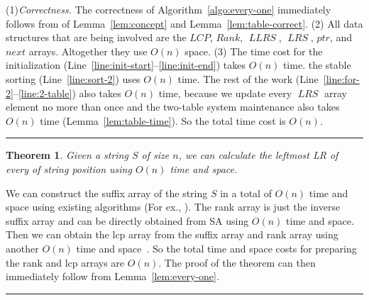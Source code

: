\documentclass[preprint]{elsarticle}
\newtheorem{theorem}{Theorem}[section]
\newcommand{\qedsymb}{\hfill{\rule{2mm}{2mm}}}
\newenvironment{proofsketch}{\begin{trivlist}
\item[\hspace{\labelsep}{\noindent Proof Sketch: }]
}{\qedsymb\end{trivlist}}
\DeclareMathOperator{\llrs}{\mathit{LLRS}}
\DeclareMathOperator{\lrs}{\mathit{LRS}}
\begin{document}
\begin{proofsketch}
  (1)\emph{Correctness.} The correctness of Algorithm~\ref{algo:every-one} immediately
  follows from of Lemma~\ref{lem:concept} and
  Lemma~\ref{lem:table-correct}.  (2) All data structures that are
  being involved are the $LCP$, $Rank$, $\llrs$, $\lrs$, $ptr$, and
  $next$ arrays.  Altogether they use $O(n)$ space.  (3) The time cost
  for the initialization
  (Line~\ref{line:init-start}--\ref{line:init-end}) takes $O(n)$ time.
  the stable sorting (Line~\ref{line:sort-2}) uses $O(n)$ time.  The
  rest of the work (Line~\ref{line:for-2}--\ref{line:2-table}) also
  takes $O(n)$ time, because we update every $\lrs$ array element no
  more than once and the two-table system maintenance also takes
  $O(n)$ time (Lemma~\ref{lem:table-time}). So the total time cost
  is $O(n)$.
\end{proofsketch}



\begin{theorem}
\label{thm:every-one}  
Given a string $S$ of size $n$, we can calculate the leftmost LR of every of string position 
using $O(n)$ time and space.   
\end{theorem}

\begin{proofsketch}
  We can construct the suffix array of the string $S$ in a total of
  $O(n)$ time and space using existing algorithms (For ex.,
  \cite{KA-SA2005}).  The rank array is just the inverse suffix array
  and can be directly obtained from SA using $O(n)$ time and
  space. Then we can obtain the lcp array from the suffix array and
  rank array using another $O(n)$ time and space~\cite{KLAAP01}. So
  the total time and space costs for preparing the rank and lcp arrays
  are $O(n)$. The proof of the theorem can then immediately follow
  from  Lemma~\ref{lem:every-one}.
\end{proofsketch}
\end{document}

